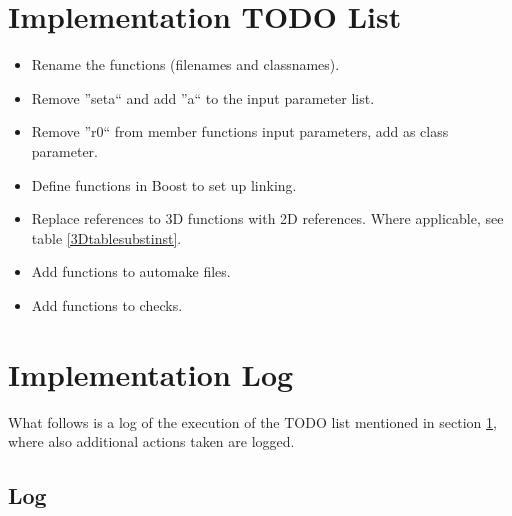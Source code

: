 \documentclass[a4paper,10pt]{article}
\begin{document}
\section{Implementation TODO List}
\label{todolist}

\begin{itemize}
\item Rename the functions (filenames and classnames).
\item Remove ''seta`` and add ''a`` to the input parameter list.
\item Remove ''r0`` from member functions input parameters, add as class parameter.
\item Define functions in Boost to set up linking.
\item Replace references to 3D functions with 2D references. Where applicable, see table \ref{3Dtablesubstinst}.
\item Add functions to automake files.
\item Add functions to checks.
\end{itemize}

\section{Implementation Log}

What follows is a log of the execution of the TODO list mentioned in section \ref{todolist}, where also additional actions taken are logged. 

\subsection{Log}
\end{document}
